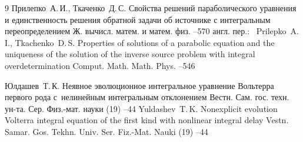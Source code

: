 \begin{thebibliography}{9}
\by Прилепко~А.\,И., Ткаченко~Д.\,С.
\paper Свойства решений параболического уравнения и единственность решения обратной задачи об источнике с интегральным переопределением
\jour Ж. вычисл. матем. и матем. физ.
--570
\transl англ. пер.:~
\by Prilepko~A.\,I., Tkachenko~D.\,S.
\paper Properties of solutions of a parabolic equation and the uniqueness of the solution of the inverse source problem with integral overdetermination
\jour Comput. Math. Math. Phys.
--546



\by Юлдашев~Т.\,К.
\paper Неявное эволюционное интегральное уравнение Вольтерра первого рода с~нелинейным интегральным отклонением
\jour Вестн. Сам. гос. техн. ун-та. Сер. Физ.-мат. науки
(19)
--44
\misctransl
\by Yuldashev~T.\,K.
\paper Nonexplicit evolution Volterra integral equation of the first kind with nonlinear integral delay
\jour Vestn. Samar. Gos. Tekhn. Univ. Ser. Fiz.-Mat. Nauki
(19)
--44


\end{thebibliography}



\noindent
\hskip6.5cm \thedate \par\noindent
\hskip6.5cm\therevdate


%
%

\makeengtitlem



 \newpage
%
%
%
